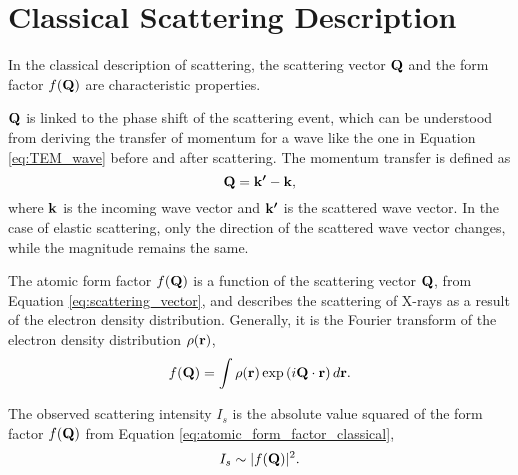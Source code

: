 

\section{Classical Scattering Description}\label{sec:classical_scattering}

In the classical description of scattering, the scattering vector $\bm{\mathrm{Q}}$ and the form factor $f(\bm{\mathrm{Q}})$ are characteristic properties.

$\bm{\mathrm{Q}}$ is linked to the phase shift of the scattering event, which can be understood from deriving the transfer of momentum for a wave like the one in Equation \eqref{eq:TEM_wave} before and after scattering.
The momentum transfer is defined as
\begin{equation}\label{eq:scattering_vector}
    \bm{\mathrm{Q}} = \bm{\mathrm{k'}} - \bm{\mathrm{k}},
\end{equation}
where $\bm{\mathrm{k}}$ is the incoming wave vector and $\bm{\mathrm{k'}}$ is the scattered wave vector.
In the case of elastic scattering, only the direction of the scattered wave vector changes, while the magnitude remains the same.

The atomic form factor $f(\bm{\mathrm{Q}})$ is a function of the scattering vector $\bm{\mathrm{Q}}$, from Equation \eqref{eq:scattering_vector},
and describes the scattering of X-rays as a result of the electron density distribution.
Generally, it is the Fourier transform of the electron density distribution $\rho(\bm{\mathrm{r}})$,
\begin{equation}\label{eq:atomic_form_factor_classical}
    f(\bm{\mathrm{Q}}) = \int \rho(\bm{\mathrm{r}}) \exp\left(i\bm{\mathrm{Q}}\cdot\bm{\mathrm{r}}\right) d\bm{\mathrm{r}}.
\end{equation}

The observed scattering intensity $I_{s}$ is the absolute value squared of the form factor $f(\bm{\mathrm{Q}})$ from Equation \eqref{eq:atomic_form_factor_classical},
\begin{equation}\label{eq:scattering_intensity_classical}
    I_{s} \sim |f(\bm{\mathrm{Q}})|^{2}.
\end{equation}

